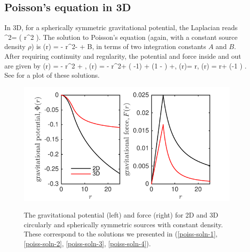 \documentclass[a4paper, 12pt]{article}
\numberwithin{equation}{section}
\begin{document}
\subsection{Poisson's equation in 3D}
In 3D, for a spherically symmetric gravitational potential, the Laplacian reads
\bea
\nabla^2\Phi = \left( r^2 \right).
\eea
The solution to Poisson's equation (again, with a constant source density $\rho$) is 
\bea
\Phi(r) = -  r^2- + B,
\eea
in terms of two integration constants $A$ and $B$.   After requiring  continuity and regularity, the potential and force inside and out are given by
\bse
\label{poiss-soln-3}
\bea
{}(r) = -  r^2 + ,
\eea
\bea
{}(r) = -  r^2+  \left( -1\right) + \left(1 - \right)  +,
\eea
\ese
\bse
\label{poiss-soln-4}
\bea
{} (r)=   r,
\eea
\bea
{}(r) =  r+ \left(-1 \right)   .
\eea
\ese
See  for a plot of these solutions.

\begin{figure}[!t]
      \begin{center}
{\includegraphics[scale=1.4,angle=0]{images/rhoin_10_comps}}
      \end{center}
\caption{ The gravitational potential (left) and force (right) for 2D and 3D circularly and spherically symmetric sources with constant density. These correspond to the solutions we presented in (\ref{poiss-soln-1},  \ref{poiss-soln-2},  \ref{poiss-soln-3},  \ref{poiss-soln-4}). }\label{fig:poisson_soln}
\end{figure}


\footnotesize{

}
\end{document}
